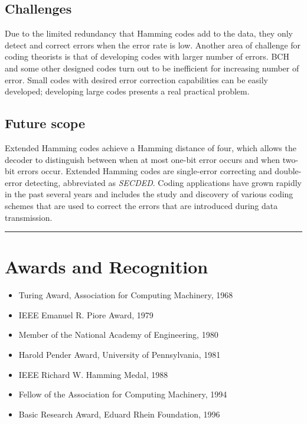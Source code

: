 \documentclass[a4paper,12pt]{article}
\begin{document}
 \subsection{Challenges}
 Due to the limited redundancy that Hamming codes add to the data, they only detect and correct errors when the error rate is low. Another area of challenge for coding theorists is that of developing codes with larger number of errors. BCH and some other designed codes turn out to be inefficient for increasing number of error. Small codes with desired error correction capabilities can be easily developed; developing large codes presents a real practical problem.
\subsection{Future scope}
 Extended Hamming codes achieve a Hamming distance of four, which allows the decoder to distinguish between when at most one-bit error occurs and when two-bit errors occur. Extended Hamming codes are single-error correcting and double-error detecting, abbreviated as \textit{SECDED}. Coding applications have grown rapidly in the past several years and includes the study and discovery of various coding schemes that are used to correct the errors that are introduced during data transmission.\\
\rule{\textwidth}{0.4pt}

\section{Awards and Recognition}
\begin{itemize}
	\item Turing Award, Association for Computing Machinery, 1968
	\item IEEE Emanuel R. Piore Award, 1979
	\item Member of the National Academy of Engineering, 1980
	\item Harold Pender Award, University of Pennsylvania, 1981
	\item IEEE Richard W. Hamming Medal, 1988
	\item Fellow of the Association for Computing Machinery, 1994
	\item Basic Research Award, Eduard Rhein Foundation, 1996
\end{itemize}
\end{document}
